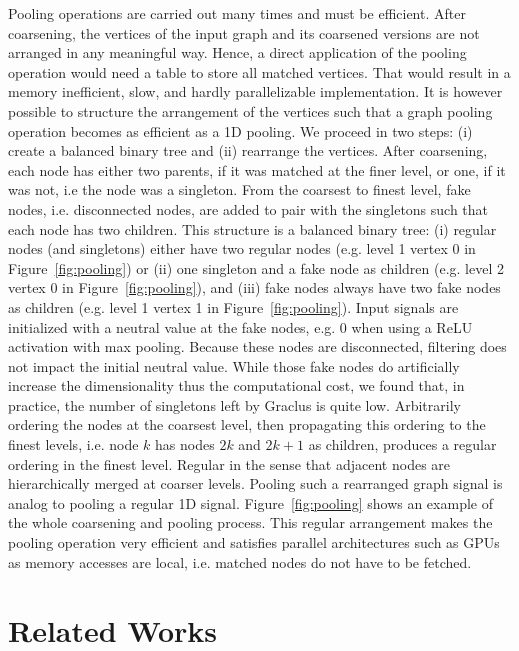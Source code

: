 \documentclass{article}
\newcommand{\figref}[1]{Figure~\ref{fig:#1}}
\begin{document}
Pooling operations are carried out many times and must be efficient. After
coarsening, the vertices of the input graph and its coarsened versions are not
arranged in any meaningful way. Hence, a direct application of the pooling
operation would need a table to store all matched vertices. That would result
in a memory inefficient, slow, and hardly parallelizable implementation. It is
however possible to structure the arrangement of the vertices such that a graph
pooling operation becomes as efficient as a 1D pooling. We proceed in two
steps: (i) create a balanced binary tree and (ii) rearrange the vertices.
After coarsening, each node has either two parents, if it was matched at the
finer level, or one, if it was not, i.e the node was a singleton. From the
coarsest to finest level, fake nodes, i.e.  disconnected nodes, are added to
pair with the singletons such that each node has two children. This structure
is a balanced binary tree: (i) regular nodes (and singletons) either have two
regular nodes (e.g. level 1 vertex 0 in \figref{pooling}) or (ii) one singleton
and a fake node as children (e.g. level 2 vertex 0 in \figref{pooling}), and
(iii) fake nodes always have two fake nodes as children (e.g. level 1 vertex 1
in \figref{pooling}). Input signals are initialized with a neutral value at the
fake nodes, e.g. 0 when using a ReLU activation with max pooling. Because these
nodes are disconnected, filtering does not impact the initial neutral value.
While those fake nodes do artificially increase the dimensionality thus the
computational cost, we found that, in practice, the number of singletons left
by Graclus is quite low.
Arbitrarily ordering the nodes at the coarsest level, then propagating this
ordering to the finest levels, i.e. node $k$ has nodes $2k$ and $2k+1$ as
children, produces a regular ordering in the finest level. Regular in the sense
that adjacent nodes are hierarchically merged at coarser levels. Pooling such a
rearranged graph signal is analog to pooling a regular 1D signal.
\figref{pooling} shows an example of the whole coarsening and pooling process.
This regular arrangement makes the pooling operation very efficient and
satisfies parallel architectures such as GPUs as memory accesses are local,
i.e.  matched nodes do not have to be fetched.

\section{Related Works}
\end{document}
